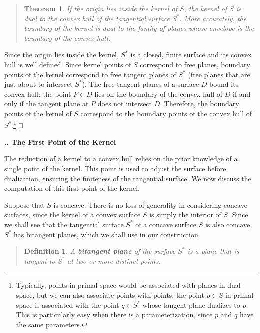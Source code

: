 \documentclass[twoside]{article}
\newtheorem{definitionenv}{Definition}
\newenvironment{defn2}{\begin{quote}\begin{definitionenv}}%
                           {\end{definitionenv}\end{quote}}
\newtheorem{theoremenv}{Theorem}
\newenvironment{theorem}{\begin{quote}\begin{theoremenv}}%
                           {\end{theoremenv}\end{quote}}
\newcommand{\prf}{\noindent{{\bf Proof}:\ \ \ }}
\newcounter{sectionc}\newcounter{subsectionc}\newcounter{subsubsectionc}
\renewcommand{\subsection}[1] {\vspace{12pt}\addtocounter{subsectionc}{1} 
	\setcounter{subsubsectionc}{0}\noindent 
	{\bf\thesectionc.\thesubsectionc. {\kern1pt \bfit #1}}\par\vspace{5pt}}
\def\qed{\hbox{${\vcenter{\vbox{			%
   \hrule height 0.4pt\hbox{\vrule width 0.4pt height 6pt
   \kern5pt\vrule width 0.4pt}\hrule height 0.4pt}}}$}}
\begin{document}
\begin{theorem}
\label{thm:kernelhull}
If the origin lies inside the kernel of $S$,
the kernel of $S$ is dual to the convex hull of the tangential surface $S^*$.
More accurately, the boundary of the kernel is dual to the family of planes whose
envelope is the boundary of the convex hull.
\end{theorem}
\prf
Since the origin lies inside the kernel, $S^*$ is a closed, finite surface
and its convex hull is well defined.
Since kernel points of $S$ correspond to free planes,
boundary points of the kernel correspond to free tangent planes of $S^*$
(free planes that are just about to intersect $S^*$).
The free tangent planes of a surface $D$ bound its convex hull: the point $P \in D$ lies
on the boundary of the convex hull of $D$ if and only if the tangent plane at $P$ 
does not intersect $D$.
Therefore, the boundary points of the kernel of $S$ correspond to the boundary points
of the convex hull of $S^*$.\footnote{Typically, points in primal space would be associated with planes in dual space,
	but we can also associate points with points:
	the point $p \in S$ in primal space is associated
	with the point $q \in S^*$ whose tangent plane dualizes to $p$.
	This is particularly easy when there is a parameterization, since $p$ and $q$ 
	have the same parameters.}
\qed\,


\subsection{The First Point of the Kernel}
\label{sec:firstpt}
\noindent
The reduction of a kernel to a convex hull relies on the prior knowledge
of a single point of the kernel.
This point is used to adjust the surface before dualization, ensuring
the finiteness of the tangential surface.
We now discuss the computation of this first point of the kernel.

Suppose that $S$ is concave.
There is no loss of generality in considering concave surfaces,
since the kernel of a convex surface $S$ is simply the interior of $S$.
Since we shall see that the tangential surface $S^*$ of
a concave surface $S$ is also concave, $S^*$ has bitangent planes,
which we shall use in our construction.

\begin{defn2}
A {\bf bitangent plane} of the surface $S^*$ is a plane that
is tangent to $S^*$ at two or more distinct points.
\end{defn2}
\end{document}
